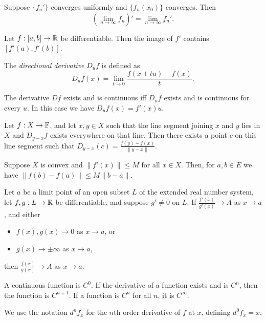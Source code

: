 \begin{prop}
    Suppose $\{f_n'\}$ converges uniformly and $\{f_n(x_0)\}$ converges. Then
    \[\left(\lim_{n\to\infty} f_n\right)'=\lim_{n\to\infty} f_n'.\]
\end{prop}
\begin{prop}
    Let $f:[a,b]\to\mathbb{R}$ be differentiable. Then the image of $f'$ contains
    $[f'(a),f'(b)]$.
\end{prop}
\begin{defn}
    The \emph{directional derivative} $D_u f$ is defined as
    \[D_u f(x)=\lim_{t\to 0}\frac{f(x+tu)-f(x)}{t}.\]
\end{defn}
\begin{prop}
    The derivative $Df$ exists and is continuous iff $D_u f$ exists and is
    continuous for every $u$. In this case we have $D_u f(x)=f'(x)u$.
\end{prop}
\begin{prop}
    Let $f:X\to\mathbb{F}$, and let $x,y\in X$ such that the line
    segment joining $x$ and $y$ lies in $X$ and $D_{y-x}f$ exists everywhere on
    that line. Then there exists a point $c$ on
    this line segment such that $D_{y-x}(c)=\frac{f(y)-f(x)}{\|y-x\|}$.
\end{prop}
\begin{prop}
    Suppose $X$ is convex and $\|f'(x)\|\le M$ for all $x\in X$. Then, for $a,b\in E$ we have
    $\|f(b)-f(a)\|\le M\|b-a\|$.
\end{prop}
\begin{prop}
    Let $a$ be a limit point of an open subset $L$ of the extended real number
    system, let $f,g:L\to\mathbb{R}$ be differentiable, and suppose $g'\ne 0$ on
    $L$. If $\frac{f'(x)}{g'(x)}\to A$ as $x\to a$, and either
    \begin{itemize}
        \item $f(x),g(x)\to 0$ as $x\to a$, or
        \item $g(x)\to\pm\infty$ as $x\to a$,
    \end{itemize}
    then $\frac{f(x)}{g(x)}\to A$ as $x\to a$.
\end{prop}
\begin{defn}
    A continuous function is $C^0$. If the derivative of a function exists and
    is $C^n$, then the function is $C^{n+1}$. If a function is $C^n$ for all
    $n$, it is $C^\infty$.
\end{defn}
\begin{defn}
    We use the notation $d^n f_x$ for the $n$th order derivative of $f$ at $x$,
    defining $d^0 f_x=x$.
\end{defn}
